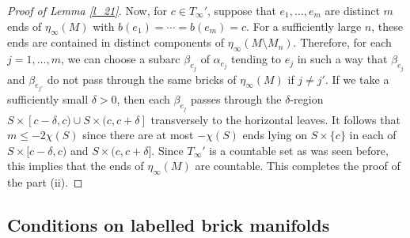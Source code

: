 \documentclass{amsart}
\theoremstyle{definition}
\numberwithin{figure}{section}
\numberwithin{equation}{section}
\newcommand{\blackboard}[1]{\ensuremath{\mathbb{#1}}}
\newcommand{\naturals}{\blackboard{N}}
\def\nn{\naturals}
\def\ck{\mathcal{K}}
\def\part{\partial}
\begin{document}
\begin{proof}[Proof of Lemma \ref{l_21}]
Now, for $c \in T_\infty'$, 
suppose that $e_1,\dots,e_m$ are distinct $m$ ends of $\eta_\infty(M)$ with $b(e_1)=\cdots=b(e_m)=c$.
For a sufficiently large $n$,  these ends are contained in distinct components of 
$\eta_\infty(M \setminus M_n)$.
Therefore,  for each $j=1, \dots, m$,  we can choose a subarc $\beta_{e_j}$ of $\alpha_{e_j}$ tending to $e_j$ in such a way that  $\beta_{e_j}$ and $\beta_{e_{j'}}$ do not pass through the 
same bricks of $\eta_\infty(M)$ if $j \neq j'$.
If we take a sufficiently small $\delta>0$, then each $\beta_{e_j}$ passes through the $\delta$-region $S\times [c-\delta, c)\cup S \times (c,c+\delta]$ transversely to the horizontal leaves.
It follows that $m\leq -2\chi(S)$ since there are at most $-\chi(S)$ ends lying on $S \times \{c\}$ in each of $S \times [c-\delta, c)$ and $S \times (c, c+\delta]$.
Since $T_\infty'$ is a countable set as was seen before, this implies that  the ends of $\eta_\infty(M)$ are countable.
This completes the proof of the part (ii).
\end{proof}




\subsection{Conditions on labelled brick manifolds}\label{SS_Conditions}

\end{document}

